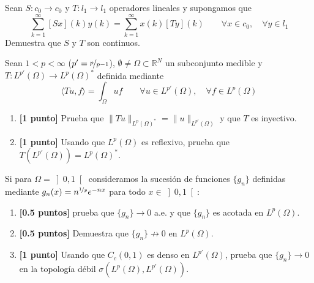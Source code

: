\documentclass[12pt]{article}
\begin{document}
    \begin{ejercicio}[3 puntos]
        Sean $S:c_0\to c_0$ y $T:l_1\to l_1$ operadores lineales y supongamos que
        \begin{equation*}
            \sum_{k=1}^{\infty}[Sx](k)y(k) = \sum_{k=1}^{\infty}x(k)[Ty](k) \qquad \forall x\in c_0, \quad \forall y\in l_1
        \end{equation*}
        Demuestra que $S$ y $T$ son continuos.
    \end{ejercicio}

    \begin{ejercicio}[4 puntos]
        Sean $1<p<\infty$ ($p' = \nicefrac{p}{p-1}$), $\emptyset \neq \Omega\subset \mathbb{R}^N$ un subconjunto medible y $T:L^{p'}(\Omega)\to L^p(\Omega)^\ast$ definida mediante
        \begin{equation*}
            \langle Tu,f \rangle  = \int_\Omega uf \qquad \forall u\in L^{p'}(\Omega), \quad \forall f\in L^p(\Omega)
        \end{equation*}
        \begin{enumerate}[label=\alph*)]
            \item \textbf{[1 punto]} Prueba que $\|Tu\|_{L^p(\Omega)^\ast} = \|u\|_{L^{p'}(\Omega)}$ y que $T$ es inyectivo.
            \item \textbf{[1 punto]} Usando que $L^p(\Omega)$ es reflexivo, prueba que $T(L^{p'}(\Omega)) = L^p(\Omega)^\ast$.
        \end{enumerate}
        Si para $\Omega = \left]0,1\right[$ consideramos la sucesión de funciones $\{g_n\}$ definidas mediante $g_n(x) = n^{\nicefrac{1}{p}}e^{-nx}$ para todo $x\in \left]0,1\right[$:
        \begin{enumerate}[label=\alph*)]
            \item[c)] \textbf{[0.5 puntos]} prueba que $\{g_n\}\to 0$ a.e. y que $\{g_n\}$ es acotada en $L^p(\Omega)$.
            \item[d)] \textbf{[0.5 puntos]} Demuestra que $\{g_n\}\not\to 0$ en $L^p(\Omega)$.
            \item[e)] \textbf{[1 punto]} Usando que $C_c(0,1)$ es denso en $L^{p'}(\Omega)$, prueba que $\{g_n\}\to 0$ en la topología débil $\sigma(L^p(\Omega),L^{p'}(\Omega))$.
        \end{enumerate}
    \end{ejercicio}


    \newpage
    \setcounter{ejercicio}{0} %
\end{document}
